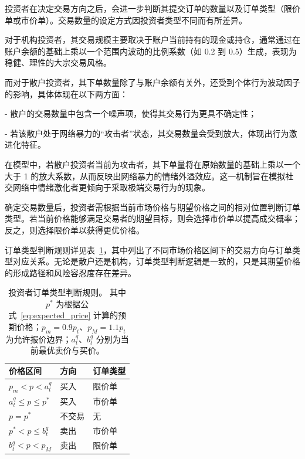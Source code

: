 投资者在决定交易方向之后，会进一步判断其提交订单的数量以及订单类型（限价单或市价单）。交易数量的设定方式因投资者类型不同而有所差异。

对于机构投资者，其交易规模主要取决于账户当前持有的现金或持仓，通常通过在账户余额的基础上乘以一个范围内波动的比例系数（如 0.2 到 0.5）生成，表现为稳健、理性的大宗交易风格。

而对于散户投资者，其下单数量除了与账户余额有关外，还受到个体行为波动因子的影响，具体体现在以下两方面：

- 散户的交易数量中包含一个噪声项，使得其交易行为更具不确定性；

- 若该散户处于网络暴力的“攻击者”状态，其交易数量会受到放大，体现出行为激进化特征。

在模型中，若散户投资者当前为攻击者，其下单量将在原始数量的基础上乘以一个大于 1 的放大系数，从而反映出网络暴力的情绪外溢效应。这一机制旨在模拟社交网络中情绪激化者更倾向于采取极端交易行为的现象。

确定交易数量后，投资者需根据当前市场价格与期望价格之间的相对位置判断订单类型。若当前价格能够满足交易者的期望目标，则会选择市价单以提高成交概率；反之，则选择限价单以获得更优价格。

订单类型判断规则详见表~\ref{tab:order_decision}，其中列出了不同市场价格区间下的交易方向与订单类型对应关系。无论是散户还是机构，订单类型判断逻辑是一致的，只是其期望价格的形成路径和风险容忍度存在差异。

\begin{table}[htbp]
    \renewcommand{\arraystretch}{1.5} %
    \centering
    \large
    \begin{tabular}{@{} >{\centering\arraybackslash}p{5.5cm} 
                    >{\centering\arraybackslash}p{3.5cm} 
                    >{\centering\arraybackslash}p{5.5cm} @{}}
    \toprule\toprule
    \textbf{价格区间} & \textbf{方向} & \textbf{订单类型} \\
    \midrule
    \( p_m < p < a_t^q \) & 买入 & 限价单 \\
    \( a_t^q \leq p \leq p^* \) & 买入 & 市价单 \\
    \( p = p^* \) & 不交易 & 无 \\
    \( p^* < p \leq b_t^q \) & 卖出 & 市价单 \\
    \( b_t^q < p < p_M \) & 卖出 & 限价单 \\
    \bottomrule\bottomrule
    \end{tabular}
    
    \vspace{1.2em}
    
    \caption{
    投资者订单类型判断规则。
    其中 \( p^* \) 为根据公式~\ref{eq:expected_price} 计算的预期价格；\( p_m = 0.9p_t \)、\( p_M = 1.1p_t \) 为允许报价边界；\( a_t^q \)、\( b_t^q \) 分别为当前最优卖价与买价。
    }
    \label{tab:order_decision}
    \end{table}

